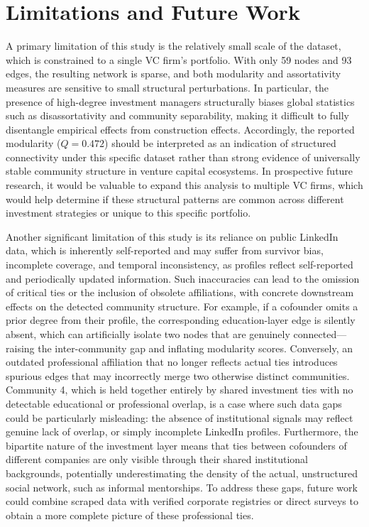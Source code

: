 \documentclass[conference]{IEEEtran}
\begin{document}
\section{Limitations and Future Work}
A primary limitation of this study is the relatively small scale of the dataset, which is constrained to a single VC firm's portfolio. With only 59 nodes and 93 edges, the resulting network is sparse, and both modularity and assortativity measures are sensitive to small structural perturbations. In particular, the presence of high-degree investment managers structurally biases global statistics such as disassortativity and community separability, making it difficult to fully disentangle empirical effects from construction effects. Accordingly, the reported modularity ($Q=0.472$) should be interpreted as an indication of structured connectivity under this specific dataset rather than strong evidence of universally stable community structure in venture capital ecosystems. In prospective future research, it would be valuable to expand this analysis to multiple VC firms, which would help determine if these structural patterns are common across different investment strategies or unique to this specific portfolio.

Another significant limitation of this study is its reliance on public LinkedIn data, which is inherently self-reported and may suffer from survivor bias, incomplete coverage, and temporal inconsistency, as profiles reflect self-reported and periodically updated information. Such inaccuracies can lead to the omission of critical ties or the inclusion of obsolete affiliations, with concrete downstream effects on the detected community structure. For example, if a cofounder omits a prior degree from their profile, the corresponding education-layer edge is silently absent, which can artificially isolate two nodes that are genuinely connected—raising the inter-community gap and inflating modularity scores. Conversely, an outdated professional affiliation that no longer reflects actual ties introduces spurious edges that may incorrectly merge two otherwise distinct communities. Community 4, which is held together entirely by shared investment ties with no detectable educational or professional overlap, is a case where such data gaps could be particularly misleading: the absence of institutional signals may reflect genuine lack of overlap, or simply incomplete LinkedIn profiles. Furthermore, the bipartite nature of the investment layer means that ties between cofounders of different companies are only visible through their shared institutional backgrounds, potentially underestimating the density of the actual, unstructured social network, such as informal mentorships. To address these gaps, future work could combine scraped data with verified corporate registries or direct surveys to obtain a more complete picture of these professional ties.
\end{document}
